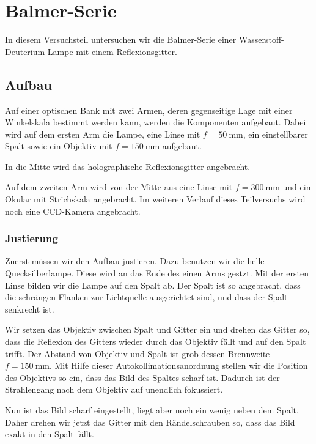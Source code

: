 \FloatBarrier
\section{Balmer-Serie}

In diesem Versuchsteil untersuchen wir die Balmer-Serie einer
Wasserstoff-Deuterium-Lampe mit einem Reflexionsgitter.

\FloatBarrier
\subsection{Aufbau}

Auf einer optischen Bank mit zwei Armen, deren gegenseitige Lage mit einer
Winkelskala bestimmt werden kann, werden die Komponenten aufgebaut. Dabei wird
auf dem ersten Arm die Lampe, eine Linse mit $f = \SI{50}{\milli\meter}$, ein
einstellbarer Spalt sowie ein Objektiv mit $f = \SI{150}{\milli\meter}$
aufgebaut.

In die Mitte wird das holographische Reflexionsgitter angebracht.

Auf dem zweiten Arm wird von der Mitte aus eine Linse mit $f =
\SI{300}{\milli\meter}$ und ein Okular mit Strichskala angebracht. Im weiteren
Verlauf dieses Teilversuchs wird noch eine CCD-Kamera angebracht.

\FloatBarrier
\subsubsection{Justierung}

Zuerst müssen wir den Aufbau justieren. Dazu benutzen wir die helle
Quecksilberlampe. Diese wird an das Ende des einen Arms gestzt. Mit der ersten
Linse bilden wir die Lampe auf den Spalt ab. Der Spalt ist so angebracht, dass
die schrängen Flanken zur Lichtquelle ausgerichtet sind, und dass der Spalt
senkrecht ist.

Wir setzen das Objektiv zwischen Spalt und Gitter ein und drehen das Gitter so,
dass die Reflexion des Gitters wieder durch das Objektiv fällt und auf den
Spalt trifft. Der Abstand von Objektiv und Spalt ist grob dessen Brennweite $f
= \SI{150}{\milli\meter}$. Mit Hilfe dieser Autokollimationsanordnung stellen
wir die Position des Objektivs so ein, dass das Bild des Spaltes scharf ist.
Dadurch ist der Strahlengang nach dem Objektiv auf unendlich fokussiert.

Nun ist das Bild scharf eingestellt, liegt aber noch ein wenig neben dem Spalt.
Daher drehen wir jetzt das Gitter mit den Rändelschrauben so, dass das Bild
exakt in den Spalt fällt.

